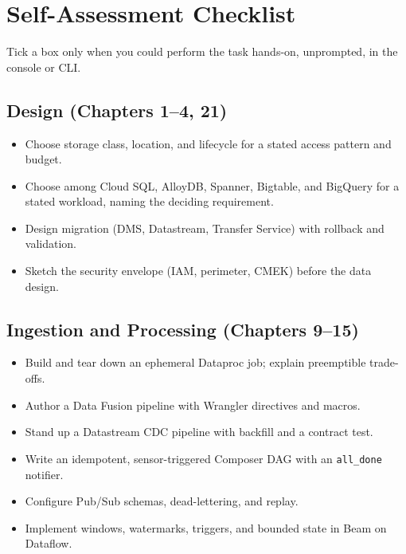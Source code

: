 \section{Self-Assessment Checklist}
Tick a box only when you could perform the task hands-on, unprompted, in the console or CLI.

\subsection*{Design (Chapters 1--4, 21)}
\begin{itemize}
    \item[$\square$] Choose storage class, location, and lifecycle for a stated access pattern and budget.
    \item[$\square$] Choose among Cloud SQL, AlloyDB, Spanner, Bigtable, and BigQuery for a stated workload, naming the deciding requirement.
    \item[$\square$] Design migration (DMS, Datastream, Transfer Service) with rollback and validation.
    \item[$\square$] Sketch the security envelope (IAM, perimeter, CMEK) before the data design.
\end{itemize}

\subsection*{Ingestion and Processing (Chapters 9--15)}
\begin{itemize}
    \item[$\square$] Build and tear down an ephemeral Dataproc job; explain preemptible trade-offs.
    \item[$\square$] Author a Data Fusion pipeline with Wrangler directives and macros.
    \item[$\square$] Stand up a Datastream CDC pipeline with backfill and a contract test.
    \item[$\square$] Write an idempotent, sensor-triggered Composer DAG with an \texttt{all\_done} notifier.
    \item[$\square$] Configure Pub/Sub schemas, dead-lettering, and replay.
    \item[$\square$] Implement windows, watermarks, triggers, and bounded state in Beam on Dataflow.
\end{itemize}

